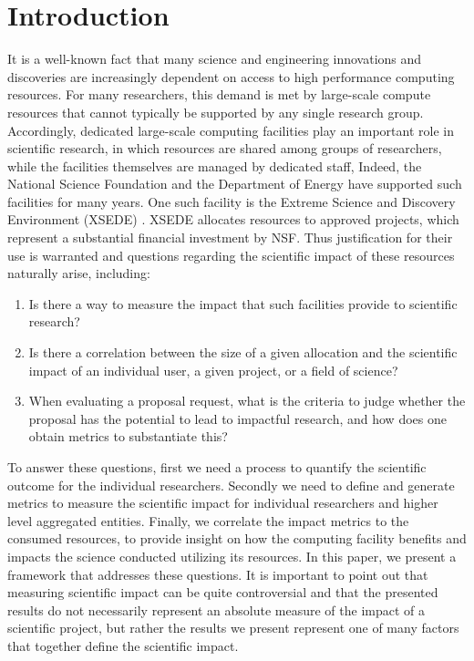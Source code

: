 \documentclass{sig-alternate}
\begin{document}
\section{Introduction} 

It is a well-known fact that many science and engineering innovations
and discoveries are increasingly dependent on access to high
performance computing resources. For many researchers, this demand is
met by large-scale compute resources that cannot typically be
supported by any single research group. Accordingly, dedicated
large-scale computing facilities play an important role in scientific
research, in which resources are shared among groups of researchers,
while the facilities themselves are managed by dedicated staff,
Indeed, the National Science Foundation and the Department of Energy
have supported such facilities for many years. One such facility is
the Extreme Science and Discovery Environment (XSEDE)
\cite{www-xsede}. XSEDE allocates resources to approved projects,
which represent a substantial financial investment by NSF. Thus
justification for their use is warranted and questions regarding the
scientific impact of these resources naturally arise, including:

\begin{enumerate}

\item Is there a way to measure the impact that such facilities
  provide to scientific research?

\item Is there a correlation between the size of a given allocation
  and the scientific impact of an individual user, a given project, or
  a field of science?

\item When evaluating a proposal request, what is the criteria to
  judge whether the proposal has the potential to lead to impactful
  research, and how does one obtain metrics to substantiate this?

\end{enumerate} 

To answer these questions, first we need a process to quantify the
scientific outcome for the individual researchers. Secondly we need to
define and generate metrics to measure the scientific impact for
individual researchers and higher level aggregated entities. Finally,
we correlate the impact metrics to the consumed resources, to provide
insight on how the computing facility benefits and impacts the science
conducted utilizing its resources. In this paper, we present a
framework that addresses these questions. It is important to point out
that measuring scientific impact can be quite controversial and that
the presented results do not necessarily represent an absolute measure
of the impact of a scientific project, but rather the results we
present represent one of many factors that together define the
scientific impact.
\end{document}
